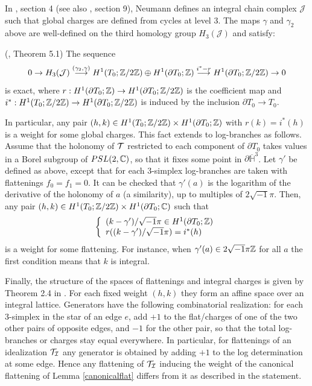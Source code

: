 In \cite{N0}, section 4 (see also \cite{N}, section 9), Neumann
defines an integral chain complex $\mathcal{J}$ such that global
charges are defined from cycles at level $3$. The maps $\gamma$
and $\gamma_2$ above are well-defined on the third homology group
$H_3(\mathcal{J})$ and satisfy:
\begin{teo}\label{theoweight}{\rm (\cite{N0}, Theorem 5.1)} The sequence
$$0\rightarrow H_3(\mathcal{J})
\stackrel{(\gamma_2,\gamma)}{\longrightarrow} H^1(T_0;\mathbb{Z}/2\mathbb{Z})
\oplus H^1(\partial T_0;\mathbb{Z}) \stackrel{i^*-r}{\longrightarrow}
H^1(\partial T_0;\mathbb{Z}/2\mathbb{Z}) \rightarrow 0$$ is exact, where $r:
H^1(\partial T_0;\mathbb{Z}) \rightarrow H^1(\partial T_0;\mathbb{Z}/2\mathbb{Z})$ is
the coefficient map and $i^*: H^1(T_0;\mathbb{Z}/2\mathbb{Z}) \rightarrow
H^1(\partial T_0;\mathbb{Z}/2\mathbb{Z})$ is induced by the inclusion $\partial
T_0 \rightarrow T_0$.
\end{teo}
In particular, any pair $(h,k) \in H^1(T_0;\mathbb{Z}/2\mathbb{Z}) \times
H^1(\partial T_0;\mathbb{Z})$ with $r(k)=i^*(h)$ is a weight for some global
charges. This fact extends to log-branches as follows. Assume that the
holonomy of ${\mathcal T}$ restricted to each component of $\partial T_0$ takes
values in a Borel subgroup of $PSL(2,\mathbb{C})$, so that it fixes some
point in $\partial \overline{\mathbb{H}}^3$. Let $\gamma'$ be defined as
above, except that for each $3$-simplex log-branches are taken with
flattenings $f_0=f_1=0$. It can be checked that $\gamma'(a)$ is the
logarithm of the derivative of the holonomy of $a$ (a similarity), up
to multiples of $2\sqrt{-1}\pi$. Then, any pair $(h,k) \in
H^1(T_0;\mathbb{Z}/2\mathbb{Z}) \times H^1(\partial T_0;\mathbb{C})$ such that
\begin{equation}\label{weightcondition}\left\lbrace
\begin{array}{l}(k-\gamma')/\sqrt{-1}\pi \in H^1(\partial T_0;\mathbb{Z})\\
r((k-\gamma')/\sqrt{-1}\pi)=i^*(h)\end{array}\right.
\end{equation}
 is a weight for some flattening. For instance, when
$\gamma'(a)\in 2\sqrt{-1}\pi\mathbb{Z}$ for all $a$ the first condition
means that $k$ is integral.

Finally, the structure of the spaces of flattenings and integral
charges is given by Theorem 2.4 in \cite{N0}. For each fixed
weight $(h,k)$ they form an affine space over an integral lattice.
Generators have the following combinatorial realization: for each
$3$-simplex in the star of an edge $e$, add $+1$ to the
flat/charges of one of the two other pairs of opposite edges, and
$-1$ for the other pair, so that the total log-branches or charges
stay equal everywhere. In particular, for flattenings of an
idealization ${\mathcal T}_{\mathcal I}$ any generator is obtained by adding $+1$ to
the log determination at some edge. Hence any flattening of
${\mathcal T}_{\mathcal I}$ inducing the weight of the canonical flattening of Lemma
\ref{canonicalflat} differs from it as described in the statement.

